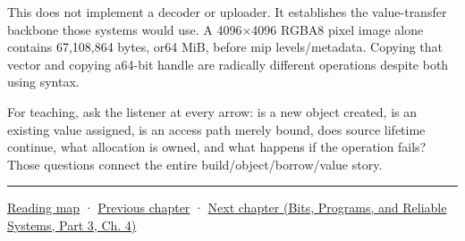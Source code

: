 This does not implement a decoder or uploader. It establishes the value-transfer backbone those systems would use. A 4096×4096 RGBA8 pixel image alone contains 67,108,864 bytes, or64 MiB, before mip levels/metadata. Copying that vector and copying a64-bit handle are radically different operations despite both using \BookInlineCode{{=}}{=} syntax.

For teaching, ask the listener at every arrow: is a new object created, is an existing value assigned, is an access path merely bound, does source lifetime continue, what allocation is owned, and what happens if the operation fails? Those questions connect the entire build/object/borrow/value story.

\begin{center}\rule{0.5\linewidth}{0.5pt}\end{center}

\hyperref[volume-reading-map]{Reading map} · \hyperref[01-foundations-i-ch002-values-at-addresses-layout-lifetimes-and-representation]{Previous chapter} · \href{../01-Bits-Programs-and-Reliable-Systems-P03/main.pdf\#01-foundations-i-ch004-prove-c-ownership-with-runnable-experiments}{Next chapter (Bits, Programs, and Reliable Systems, Part 3, Ch. 4)}
